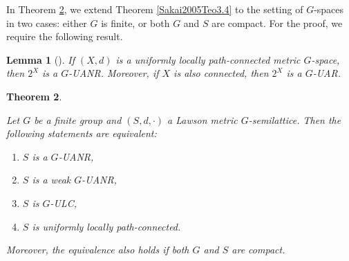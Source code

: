 \documentclass[12pt]{amsart}
\newtheorem{theorem}{Theorem}[section]
\newtheorem{lemma}[theorem]{Lemma}
\theoremstyle{definition}
\begin{document}
	In Theorem \ref{SakaiGfinito}, we extend Theorem \ref{Sakai2005Teo3.4} to the setting of $G$-spaces in two cases: either $G$ is finite, or both $G$ and $S$ are compact. For the proof, we require the following result.
	
	\begin{lemma}[\cite{A10}]\label{hyperauto}
		\rm{If $(X,d)$ is a uniformly locally path-connected metric $G$-space, then $2^X$ is a $G$-UANR. Moreover, if $X$ is also connected, then $2^X$ is a $G$-UAR.}
	\end{lemma}
	
	
	\begin{theorem}\label{SakaiGfinito}
		\rm{Let $G$ be a finite group and $(S,d,\cdot)$ a Lawson metric $G$-semilattice. Then the following statements are equivalent:
			\begin{enumerate}
				\item [(i)] $S$ is a $G$-UANR,
				\item [(ii)] $S$ is a weak $G$-UANR,
				\item [(iii)] $S$ is $G$-ULC,
				\item [(iv)] $S$ is uniformly locally path-connected.
			\end{enumerate}
			
			Moreover, the equivalence also holds if both $G$ and $S$ are compact.}
		
	\end{theorem}
	
\end{document}
